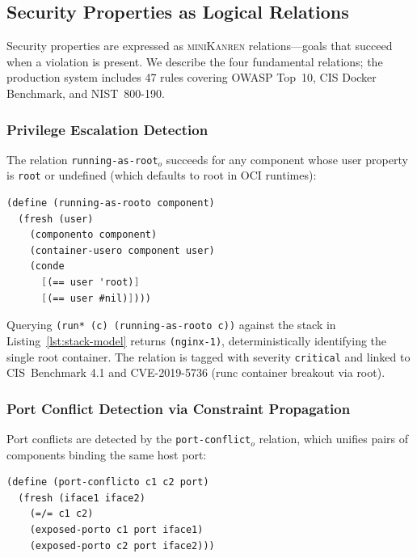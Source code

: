 \documentclass[11pt,twocolumn]{article}
\newcommand{\minikanren}{\textsc{miniKanren}\xspace}
\begin{document}
\subsection{Security Properties as Logical Relations}
\label{sec:engine-rules}

Security properties are expressed as \minikanren relations---goals
that succeed when a violation is present. We describe the four
fundamental relations; the production system includes 47 rules
covering OWASP Top~10, CIS Docker Benchmark, and NIST~800-190.

\subsubsection{Privilege Escalation Detection}
\label{sec:rule-root}

The relation \texttt{running-as-root$_o$} succeeds for any component
whose user property is \texttt{root} or undefined (which defaults to
root in OCI runtimes):

\begin{lstlisting}[language=Scheme,caption={Root container detection
as a logical relation.},label=lst:root-rule]
(define (running-as-rooto component)
  (fresh (user)
    (componento component)
    (container-usero component user)
    (conde
      [(== user 'root)]
      [(== user #nil)])))
\end{lstlisting}

Querying \texttt{(run* (c) (running-as-rooto c))} against the stack
in Listing~\ref{lst:stack-model} returns \texttt{(nginx-1)},
deterministically identifying the single root container. The relation
is tagged with severity \texttt{critical} and linked to CIS~Benchmark
4.1 and CVE-2019-5736 (runc container breakout via root).

\subsubsection{Port Conflict Detection via Constraint Propagation}
\label{sec:rule-ports}

Port conflicts are detected by the \texttt{port-conflict$_o$} relation,
which unifies pairs of components binding the same host port:

\begin{lstlisting}[language=Scheme,caption={Port conflict detection.},
label=lst:port-conflict]
(define (port-conflicto c1 c2 port)
  (fresh (iface1 iface2)
    (=/= c1 c2)
    (exposed-porto c1 port iface1)
    (exposed-porto c2 port iface2)))
\end{lstlisting}
\end{document}
